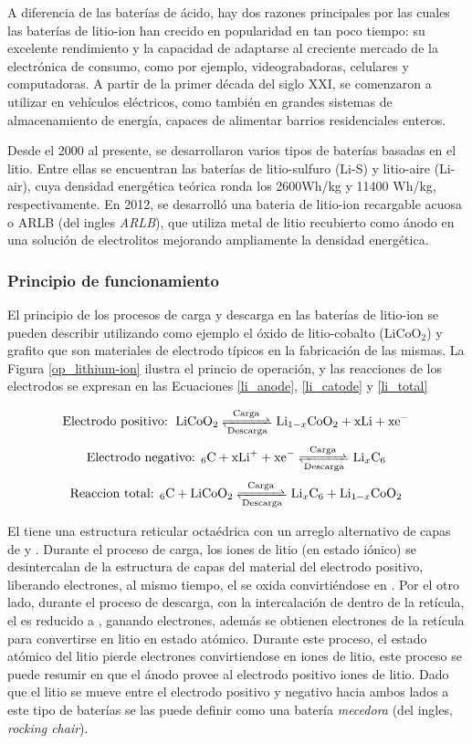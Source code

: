 \documentclass[10pt,a4paper]{article}
\newcommand\reaction[1]{\begin{equation}\ce{#1}\end{equation}}
\begin{document}
\newpage

\noindent A diferencia de las baterías de ácido, hay dos razones principales por
las cuales las baterías de litio-ion han crecido en popularidad en tan poco
tiempo: su excelente rendimiento y la capacidad de adaptarse al creciente
mercado de la electrónica de consumo, como por ejemplo, videograbadoras,
celulares y computadoras. A partir de la primer década del siglo XXI, se
comenzaron a utilizar en vehículos eléctricos, como también en grandes sistemas
de almacenamiento de energía, capaces de alimentar barrios residenciales
enteros.

\noindent Desde el 2000 al presente, se desarrollaron varios tipos de 
bater\'ias basadas en el litio. Entre ellas se encuentran las bater\'ias de 
litio-sulfuro (Li-S) y litio-aire (Li-air), cuya densidad energética teórica 
ronda los 2600Wh/kg y 11400 Wh/kg, respectivamente. En 2012, se desarrolló una 
bateria de litio-ion recargable acuosa o \acrshort{ARLB} (del ingles
\emph{\acrlong{ARLB}}), que utiliza metal de litio recubierto como ánodo en una
solución de electrolitos mejorando ampliamente la densidad energética.

\subsubsection{Principio de funcionamiento}\label{battery_fun}

El principio de los procesos de carga y descarga en las baterías de litio-ion se
pueden describir utilizando como ejemplo el óxido de litio-cobalto 
($\mathrm{LiCoO_2}$) y grafito que son materiales de electrodo t\'ipicos en la
fabricaci\'on de las mismas. La Figura \ref{op_lithium-ion} ilustra el
princio de operación, y las reacciones de los electrodos se expresan en  las
Ecuaciones \ref{li_anode}, \ref{li_catode} y \ref{li_total}

\reaction{\text{Electrodo positivo: } LiCoO2 <=>[Carga][Descarga] Li_{1-x}CoO2 + xLi + xe^- \label{li_anode}}
\reaction{\text{Electrodo negativo: }6C + xLi^+ + xe^- <=>[Carga][Descarga] Li_{x}C6 \label{li_catode}}
\reaction{\text{Reaccion total: }6C + LiCoO2 <=>[Carga][Descarga] Li_{x}C6 + Li_{1-x}CoO2 \label{li_total}}

\noindent El  tiene una estructura reticular octa\'edrica con un
arreglo alternativo de capas de  y . Durante el proceso de
carga, los iones de litio (en estado iónico) se desintercalan de la estructura
de capas del material del electrodo positivo, liberando electrones, al mismo
tiempo, el  se oxida convirti\'endose en .  Por el otro
lado, durante el proceso de descarga, con la intercalación de  dentro de
la ret\'icula, el  es reducido a , ganando electrones,
adem\'as se obtienen electrones de la ret\'icula para convertirse en litio en 
estado atómico. Durante este proceso, el estado atómico del litio pierde 
electrones convirtiendose en iones de litio, este proceso se puede resumir en 
que el ánodo provee al electrodo positivo iones de litio. Dado que el litio se 
mueve entre el electrodo positivo y negativo hacia ambos lados a este tipo de 
baterías se las puede definir como una batería \emph{mecedora} (del ingles,
\emph{rocking chair}).
\end{document}
